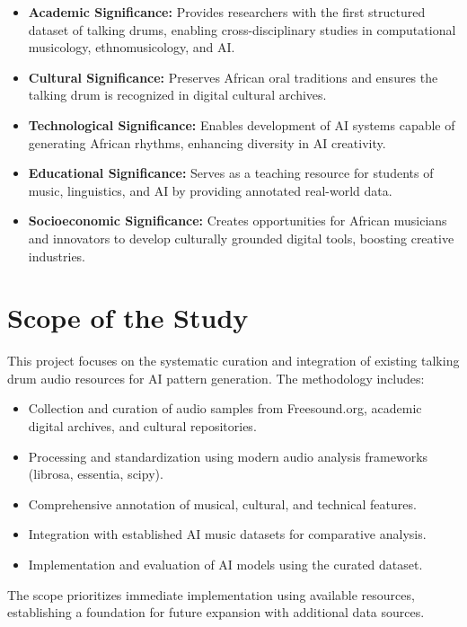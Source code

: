 \documentclass[12pt,a4paper]{article}
\begin{document}
\begin{itemize}
\item \textbf{Academic Significance:} Provides researchers with the first structured dataset of talking drums, enabling cross-disciplinary studies in computational musicology, ethnomusicology, and AI.
\item \textbf{Cultural Significance:} Preserves African oral traditions and ensures the talking drum is recognized in digital cultural archives.
\item \textbf{Technological Significance:} Enables development of AI systems capable of generating African rhythms, enhancing diversity in AI creativity.
\item \textbf{Educational Significance:} Serves as a teaching resource for students of music, linguistics, and AI by providing annotated real-world data.
\item \textbf{Socioeconomic Significance:} Creates opportunities for African musicians and innovators to develop culturally grounded digital tools, boosting creative industries.
\end{itemize}

\section{Scope of the Study}

This project focuses on the systematic curation and integration of existing talking drum audio resources for AI pattern generation. The methodology includes:

\begin{itemize}
\item Collection and curation of audio samples from Freesound.org, academic digital archives, and cultural repositories.
\item Processing and standardization using modern audio analysis frameworks (librosa, essentia, scipy).
\item Comprehensive annotation of musical, cultural, and technical features.
\item Integration with established AI music datasets for comparative analysis.
\item Implementation and evaluation of AI models using the curated dataset.
\end{itemize}

The scope prioritizes immediate implementation using available resources, establishing a foundation for future expansion with additional data sources.
\end{document}
